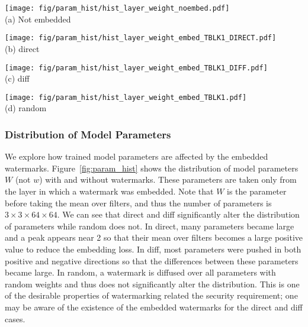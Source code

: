 \documentclass[10pt,twocolumn,letterpaper]{article}
\begin{document}
\begin{figure*}[tb]
	\begin{minipage}[b]{0.24\linewidth}
		\texttt{[image: fig/param\_hist/hist\_layer\_weight\_noembed.pdf]} \\
	\centering (a) \textsf{Not embedded}
	\end{minipage}
	\begin{minipage}[b]{0.24\linewidth}
		\texttt{[image: fig/param\_hist/hist\_layer\_weight\_embed\_TBLK1\_DIRECT.pdf]} \\
	\centering (b) \textsf{direct}
	\end{minipage}
	\begin{minipage}[b]{0.24\linewidth}
		\texttt{[image: fig/param\_hist/hist\_layer\_weight\_embed\_TBLK1\_DIFF.pdf]} \\
	\centering (c) \textsf{diff}
	\end{minipage}
	\begin{minipage}[b]{0.24\linewidth}
		\texttt{[image: fig/param\_hist/hist\_layer\_weight\_embed\_TBLK1.pdf]} \\
	\centering (d) \textsf{random}
	\end{minipage}
	\caption{Distribution of model parameters $W$ with and without watermarks.}
	\label{fig:param_hist}
\end{figure*}

\subsubsection{Distribution of Model Parameters}
We explore how trained model parameters are affected by the embedded watermarks.
Figure~\ref{fig:param_hist} shows the distribution of model parameters $W$ (not $w$) with and without watermarks.
These parameters are taken only from the layer in which a watermark was embedded.
Note that $W$ is the parameter before taking the mean over filters, and thus the number of parameters is $3 \times 3 \times 64 \times 64$.
We can see that \textsf{direct} and \textsf{diff} significantly alter the distribution of parameters while \textsf{random} does not.
In \textsf{direct}, many parameters became large and a peak appears near 2 so that their mean over filters becomes a large positive value to reduce the embedding loss.
In \textsf{diff}, most parameters were pushed in both positive and negative directions so that the differences between these parameters became large.
In \textsf{random}, a watermark is diffused over all parameters with random weights and thus does not significantly alter the distribution.
This is one of the desirable properties of watermarking related the security requirement; one may be aware of the existence of the embedded watermarks for the \textsf{direct} and \textsf{diff} cases.
\end{document}
